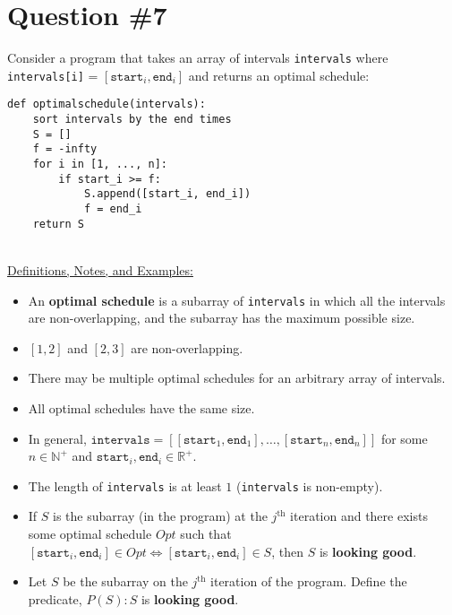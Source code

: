 \documentclass[12pt]{article}
\begin{document}
\section*{Question \#7}
Consider a program that takes an array of intervals \texttt{intervals} where \texttt{intervals[i]} = \( [\texttt{start}_i, \texttt{end}_i] \) and returns an optimal schedule: \\
\begin{lstlisting}
def optimalschedule(intervals):
    sort intervals by the end times
    S = []
    f = -infty
    for i in [1, ..., n]:
        if start_i >= f:
            S.append([start_i, end_i])
            f = end_i
    return S
\end{lstlisting}
\leavevmode\\
\underline{Definitions, Notes, and Examples:}
\begin{itemize}
    \item An \textbf{optimal schedule} is a subarray of \texttt{intervals} in which all the intervals are non-overlapping, and the subarray has the maximum possible size.
    \item \( [1, 2] \) and \( [2, 3] \) are non-overlapping.
    \item There may be multiple optimal schedules for an arbitrary array of intervals.
    \item All optimal schedules have the same size.
    \item In general, \( \texttt{intervals} = [[\texttt{start}_1, \texttt{end}_1], \dots, [\texttt{start}_n, \texttt{end}_n]] \) for some \( n \in \mathbb{N}^+ \) and \( \texttt{start}_i, \texttt{end}_i \in \mathbb{R}^+ \).
    \item The length of \texttt{intervals} is at least $1$ (\texttt{intervals} is non-empty).
    \item If \( S \) is the subarray (in the program) at the \( j^{\text{th}} \) iteration and there exists some optimal schedule \( Opt \) such that \( [\texttt{start}_i, \texttt{end}_i] \in Opt \iff [\texttt{start}_i, \texttt{end}_i] \in S \), then \( S \) is \textbf{looking good}.
    \item Let \( S \) be the subarray on the \( j^{\text{th}} \) iteration of the program. Define the predicate, \( P(S): S \) is \textbf{looking good}.
\end{itemize}
\end{document}
